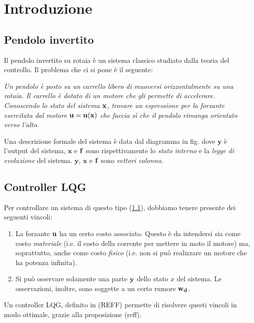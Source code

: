 \section{Introduzione}\label{sec:introduzione}
\subsection{Pendolo invertito}\label{subsec:intro-pendolo}
  Il pendolo invertito su rotaia è un sistema classico studiato dalla teoria del controllo.
  Il problema che ci si pone è il seguente:
  \begin{framed}
  \emph{
      Un pendolo è posto su un carrello libero di muoversi orizzontalmente su una rotaia.
      Il carrello è dotato di un motore che gli permette di accelerare. Conoscendo lo stato del sistema
      $\bf x$, trovare un espressione per la forzante esercitata dal motore $\bf u = \bf u(\bf x)$ che faccia sì
      che il pendolo rimanga orientato verso l'alto.
    }
  \end{framed}

  Una descrizione formale del sistema è data dal diagramma in fig. %
  dove $\mathbf y$ è l'output del sistema, $\mathbf x$ e $\bf f$ sono rispettivamente
  lo \emph{stato interno} e la \emph{legge di evoluzione} del sistema. $\mathbf y$, $\mathbf x$ e $\bf f$ sono
  \emph{vettori colonna}.

\subsection{Controller \textsc{LQG}}\label{subsec:intro-lqg}
Per controllare un sistema di questo tipo (\ref{subsec:intro-pendolo}), dobbiamo tenere presente dei seguenti vincoli:
\begin{enumerate}
  \item%
    La forzante $\bf u$ ha un certo costo associato.
    Questo è da intendersi sia come costo \emph{materiale} (i.e. il costo della corrente per mettere in moto
    il motore) ma, soprattutto, anche come costo \emph{fisico} (i.e. non si può realizzare un motore che ha potenza
    infinita).
  \item%
    Si può osservare solamente una parte $\bf y$ dello stato $x$ del sistema.
    Le osservazioni, inoltre, sono soggette a un certo rumore $\bf w_d$.
\end{enumerate}

Un controller \textsc{LQG}, definito in (REFF) permette di risolvere questi vincoli in modo ottimale, grazie
alla proposizione (reff). %

